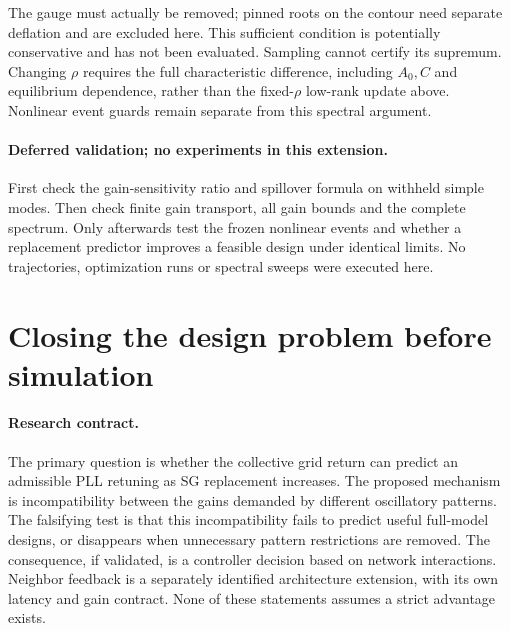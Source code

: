 \documentclass[11pt]{article}
\begin{document}
The gauge must actually be removed; pinned roots on the contour
need separate deflation and are excluded here.
This sufficient condition is potentially conservative and has not
been evaluated. Sampling cannot certify its supremum.
Changing $\rho$ requires the full characteristic difference,
including $A_0,C$ and equilibrium dependence, rather than the
fixed-$\rho$ low-rank update above. Nonlinear event guards remain
separate from this spectral argument.

\paragraph{Deferred validation; no experiments in this extension.}
First check the gain-sensitivity ratio and spillover formula on
withheld simple modes. Then check finite gain transport, all
gain bounds and the complete spectrum. Only afterwards test
the frozen nonlinear events and whether a replacement predictor
improves a feasible design under identical limits. No trajectories,
optimization runs or spectral sweeps were executed here.

\section{Closing the design problem before simulation}\label{sec:closure}

\paragraph{Research contract.}
The primary question is whether the collective grid return can predict
an admissible PLL retuning as SG replacement increases. The proposed
mechanism is incompatibility between the gains demanded by different
oscillatory patterns. The falsifying test is that this incompatibility
fails to predict useful full-model designs, or disappears when unnecessary
pattern restrictions are removed. The consequence, if validated, is a
controller decision based on network interactions. Neighbor feedback is
a separately identified architecture extension, with its own latency and
gain contract. None of these statements assumes a strict advantage exists.
\end{document}
